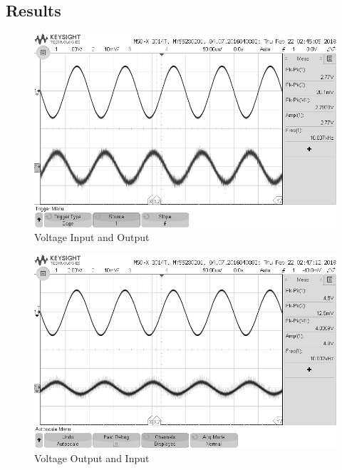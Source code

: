 \documentclass[journal, letterpaper]{IEEEtran}
\begin{document}
	\subsection{Results}
    \begin{figure}[!hbt]
    \begin{center}
    \includegraphics[width=\columnwidth]{scope_16}
    \caption{Voltage Input and Output}
    \label{fig:scope_17}
    \end{center}
    \end{figure}
    \begin{figure}[!hbt]
    \begin{center}
    \includegraphics[width=\columnwidth]{scope_17}
    \caption{Voltage Output and Input}
    \label{fig:scope_18}
    \end{center}
    \end{figure}
\end{document}
